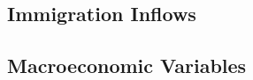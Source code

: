 \documentclass[12pt]{scrartcl}
\numberwithin{equation}{section}				%
\begin{document}
    \subsection{Immigration Inflows}
    
    \subsection{Macroeconomic Variables}
    
    
    
\end{document}
